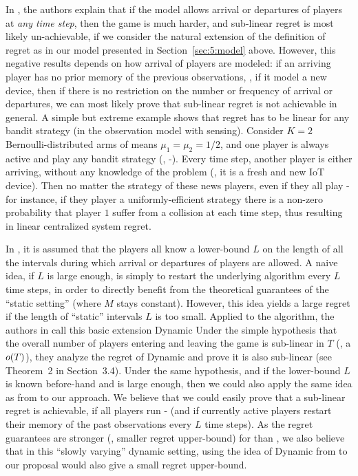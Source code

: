 In \cite{Rosenski16}, the authors explain that if the model allows arrival or departures of players at \emph{any time step}, then the game is much harder, and sub-linear regret is most likely un-achievable, if we consider the natural extension of the definition of regret as in our model presented in Section~\ref{sec:5:model} above.
However, this negative results depends on how arrival of players are modeled:
if an arriving player has no prior memory of the previous observations, \ie, if it model a new device, then if there is no restriction on the number or frequency of arrival or departures, we can most likely prove that sub-linear regret is not achievable in general.
A simple but extreme example shows that regret has to be linear for any bandit strategy (in the observation model with sensing).
Consider $K=2$ Bernoulli-distributed arms of means $\mu_1=\mu_2=1/2$, and one player is always active and play any bandit strategy (\eg, \MCTopM-\klUCB).
Every time step, another player is either arriving, without any knowledge of the problem (\eg, it is a fresh and new IoT device). Then no matter the strategy of these news players, even if they all play \MCTopM-\klUCB{} for instance, if they player a uniformly-efficient strategy there is a non-zero probability that player $1$ suffer from a collision at each time step, thus resulting in linear centralized system regret.

In \cite{Rosenski16}, it is assumed that the players all know a lower-bound $L$ on the length of all the intervals during which arrival or departures of players are allowed.
A naive idea, if $L$ is large enough, is simply to restart the underlying algorithm every $L$ time steps, in order to directly benefit from the theoretical guarantees of the ``static setting'' (where $M$ stays constant).
However, this idea yields a large regret if the length of ``static'' intervals $L$ is too small.
Applied to the \MusicalChair{} algorithm, the authors in \cite{Rosenski16} call this basic extension Dynamic \MusicalChair
Under the simple hypothesis that the overall number of players entering and leaving the game is sub-linear in $T$ (\ie, a $\mathop{}\mathopen{}o\mathopen{}\left(T\right)$), they analyze the regret of Dynamic \MusicalChair{} and prove it is also sub-linear (see Theorem~2 in Section~3.4).
%
Under the same hypothesis, and if the lower-bound $L$ is known before-hand and is large enough, then we could also apply the same idea as from \cite{Rosenski16} to our approach. We believe that we could easily prove that a sub-linear regret is achievable, if all players run \MCTopM-\klUCB{} (and if currently active players restart their memory of the past observations every $L$ time steps).
As the regret guarantees are stronger (\ie, smaller regret upper-bound) for \MCTopM{} than \MusicalChair, we also believe that in this ``slowly varying'' dynamic setting, using the idea of Dynamic \MusicalChair{} from \cite{Rosenski16} to our proposal \MCTopM{} would also give a small regret upper-bound.

